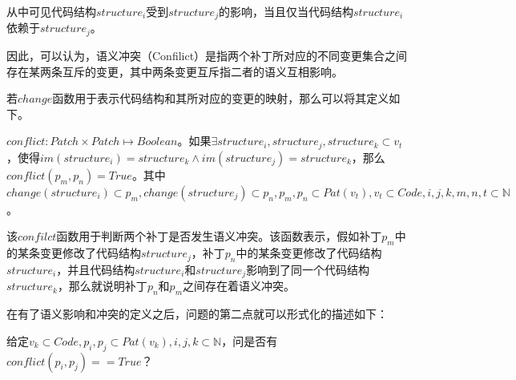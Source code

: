 从中可见代码结构$structure_i$受到$structure_j$的影响，当且仅当代码结构$structure_i$依赖于$structure_j$。


%

因此，可以认为，语义冲突（Confilict）是指两个补丁所对应的不同变更集合之间存在某两条互斥的变更，其中两条变更互斥指二者的语义互相影响。

若$change$函数用于表示代码结构和其所对应的变更的映射，那么可以将其定义如下。

%	



\begin{definition}
	$conflict: Patch \times Patch \mapsto Boolean$。如果$\exists structure_i,structure_j,structure_k \subset v_t$，使得$im(structure_i) = structure_k \land im(structure_j) = structure_k$，那么$conflict(p_m,p_n) = True$。其中$change(structure_i) \subset p_m,change(structure_j) \subset p_n,p_m,p_n \subset Pat(v_t),v_t \subset Code,i,j,k,m,n,t \subset \mathbb{N}$。
\end{definition}

该$confilct$函数用于判断两个补丁是否发生语义冲突。该函数表示，假如补丁$p_m$中的某条变更修改了代码结构$structure_j$，补丁$p_n$中的某条变更修改了代码结构$structure_i$，并且代码结构$structure_i$和$structure_j$影响到了同一个代码结构$structure_k$，那么就说明补丁$p_n$和$p_m$之间存在着语义冲突。

在有了语义影响和冲突的定义之后，问题的第二点就可以形式化的描述如下：

	给定$v_k \subset Code, p_i,p_j \subset Pat(v_k),i,j,k \subset \mathbb{N}$，问是否有$conflict(p_i,p_j) == True$？

%

